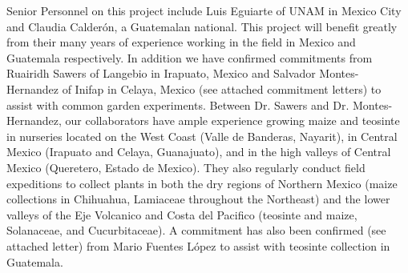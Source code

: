 Senior Personnel on this project include Luis Eguiarte of UNAM in Mexico City and Claudia Calder\'{o}n, a Guatemalan national.  This project will benefit greatly from their many years of experience working in the field in Mexico and Guatemala respectively.  In addition we have confirmed commitments from Ruairidh Sawers of Langebio in Irapuato, Mexico and Salvador Montes-Hernandez of Inifap in Celaya, Mexico (see attached commitment letters) to assist with common garden experiments.  Between Dr. Sawers and Dr. Montes-Hernandez, our collaborators have ample experience growing maize and teosinte in nurseries located on the West Coast (Valle de Banderas, Nayarit), in Central Mexico (Irapuato and Celaya, Guanajuato), and in the high valleys of Central Mexico (Queretero, Estado de Mexico). They also regularly conduct field expeditions to collect plants in both the dry regions of Northern Mexico (maize collections in Chihuahua, Lamiaceae throughout the Northeast) and the lower valleys of the Eje Volcanico and Costa del Pacifico (teosinte and maize, Solanaceae, and Cucurbitaceae).  A commitment has also been confirmed (see attached letter) from Mario Fuentes L\'{o}pez to assist with teosinte collection in Guatemala.